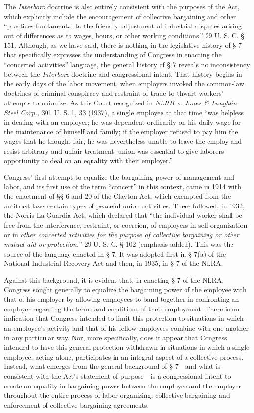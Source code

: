 \documentclass[
  letterpaper,
  11pt,
  DIV=9,
  openright]{scrbook}
\begin{document}
The \emph{Interboro} doctrine is also entirely consistent with the
purposes of the Act, which explicitly include the encouragement of
collective bargaining and other ``practices fundamental to the friendly
adjustment of industrial disputes arising out of differences as to
wages, hours, or other working conditions.'' 29 U. S. C. § 151.
Although, as we have said, there is nothing in the legislative history
of § 7 that specifically expresses the understanding of Congress in
enacting the ``concerted activities'' language, the general history of §
7 reveals no inconsistency between the \emph{Interboro} doctrine and
congressional intent. That history begins in the early days of the labor
movement, when employers invoked the common-law doctrines of criminal
conspiracy and restraint of trade to thwart workers' attempts to
unionize. As this Court recognized in \emph{NLRB v. Jones \& Laughlin
Steel Corp.,} 301 U. S. 1, 33 (1937), a single employee at that time
``was helpless in dealing with an employer; he was dependent ordinarily
on his daily wage for the maintenance of himself and family; if the
employer refused to pay him the wages that he thought fair, he was
nevertheless unable to leave the employ and resist arbitrary and unfair
treatment; union was essential to give laborers opportunity to deal on
an equality with their employer.''

Congress' first attempt to equalize the bargaining power of management
and labor, and its first use of the term ``concert'' in this context,
came in 1914 with the enactment of §§ 6 and 20 of the Clayton Act, which
exempted from the antitrust laws certain types of peaceful union
activities. There followed, in 1932, the Norris-La Guardia Act, which
declared that ``the individual worker shall be free from the
interference, restraint, or coercion, of employers in self-organization
or in \emph{other} \emph{concerted activities for the purpose of
collective bargaining or other mutual aid or protection.}'' 29 U. S. C.
§ 102 (emphasis added). This was the source of the language enacted in §
7. It was adopted first in § 7(a) of the National Industrial Recovery
Act and then, in 1935, in § 7 of the NLRA.

Against this background, it is evident that, in enacting § 7 of the
NLRA, Congress sought generally to equalize the bargaining power of the
employee with that of his employer by allowing employees to band
together in confronting an employer regarding the terms and conditions
of their employment. There is no indication that Congress intended to
limit this protection to situations in which an employee's activity and
that of his fellow employees combine with one another in any particular
way. Nor, more specifically, does it appear that Congress intended to
have this general protection withdrawn in situations in which a single
employee, acting alone, participates in an integral aspect of a
collective process. Instead, what emerges from the general background of
§ 7---and what is consistent with the Act's statement of purpose---is a
congressional intent to create an equality in bargaining power between
the employee and the employer throughout the entire process of labor
organizing, collective bargaining and enforcement of
collective-bargaining agreements.
\end{document}
